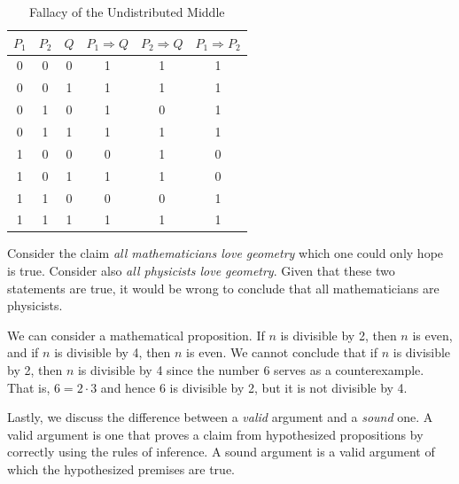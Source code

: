         \begin{table}
            \centering
            \captionsetup{type=table}
            \begin{tabular}{c|c|c|c|c|c}
                $P_{1}$&$P_{2}$&$Q$&$P_{1}\Rightarrow{Q}$&$P_{2}\Rightarrow{Q}$
                                   &$P_{1}\Rightarrow{P}_{2}$\\
                \hline
                0&0&0&1&1&1\\
                0&0&1&1&1&1\\
                0&1&0&1&0&1\\
                0&1&1&1&1&1\\
                1&0&0&0&1&0\\
                1&0&1&1&1&0\\
                1&1&0&0&0&1\\
                1&1&1&1&1&1
            \end{tabular}
            \caption{Fallacy of the Undistributed Middle}
            \label{tab:Fallcy_of_Undistributed_Middle}
        \end{table}
        \begin{example}
            Consider the claim \textit{all mathematicians love geometry} which
            one could only hope is true. Consider also
            \textit{all physicists love geometry}. Given that these two
            statements are true, it would be wrong to conclude that all
            mathematicians are physicists.
        \end{example}
        \begin{example}
            We can consider a mathematical proposition. If $n$ is divisible by
            2, then $n$ is even, and if $n$ is divisible by 4, then $n$ is even.
            We cannot conclude that if $n$ is divisible by 2, then $n$ is
            divisible by 4 since the number 6 serves as a counterexample. That
            is, $6=2\cdot{3}$ and hence 6 is divisible by 2, but it is not
            divisible by 4.
        \end{example}
        Lastly, we discuss the difference between a \textit{valid} argument and
        a \textit{sound} one. A valid argument is one that proves a claim from
        hypothesized propositions by correctly using the rules of inference. A
        sound argument is a valid argument of which the hypothesized
        premises are true.
